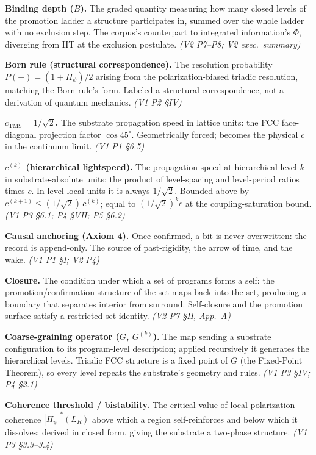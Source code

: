 \documentclass[11pt,oneside]{report}
\theoremstyle{definition}
\theoremstyle{remark}
\begin{document}
\textbf{Binding depth ($B$).} The graded quantity measuring how many closed levels of the promotion ladder a structure participates in, summed over the whole ladder with no exclusion step. The corpus's counterpart to integrated information's $\Phi$, diverging from IIT at the exclusion postulate. \emph{(V2 P7--P8; V2 exec.\ summary)}

\textbf{Born rule (structural correspondence).} The resolution probability $P(+)=(1+\Pi_\psi)/2$ arising from the polarization-biased triadic resolution, matching the Born rule's form. Labeled a structural correspondence, not a derivation of quantum mechanics. \emph{(V1 P2 \S IV)}

\textbf{$c_{\mathrm{TMS}} = 1/\sqrt{2}$.} The substrate propagation speed in lattice units: the FCC face-diagonal projection factor $\cos 45^\circ$. Geometrically forced; becomes the physical $c$ in the continuum limit. \emph{(V1 P1 \S 6.5)}

\textbf{$c^{(k)}$ (hierarchical lightspeed).} The propagation speed at hierarchical level $k$ in substrate-absolute units: the product of level-spacing and level-period ratios times $c$. In level-local units it is always $1/\sqrt{2}$. Bounded above by $c^{(k+1)} \le (1/\sqrt{2})\,c^{(k)}$; equal to $(1/\sqrt{2})^k c$ at the coupling-saturation bound. \emph{(V1 P3 \S 6.1; P4 \S VII; P5 \S 6.2)}

\textbf{Causal anchoring (Axiom 4).} Once confirmed, a bit is never overwritten: the record is append-only. The source of past-rigidity, the arrow of time, and the wake. \emph{(V1 P1 \S I; V2 P4)}

\textbf{Closure.} The condition under which a set of programs forms a self: the promotion/confirmation structure of the set maps back into the set, producing a boundary that separates interior from surround. Self-closure and the promotion surface satisfy a restricted set-identity. \emph{(V2 P7 \S II, App.\ A)}

\textbf{Coarse-graining operator ($G$, $G^{(k)}$).} The map sending a substrate configuration to its program-level description; applied recursively it generates the hierarchical levels. Triadic FCC structure is a fixed point of $G$ (the Fixed-Point Theorem), so every level repeats the substrate's geometry and rules. \emph{(V1 P3 \S IV; P4 \S 2.1)}

\textbf{Coherence threshold / bistability.} The critical value of local polarization coherence $|\Pi_\psi|^*(L_R)$ above which a region self-reinforces and below which it dissolves; derived in closed form, giving the substrate a two-phase structure. \emph{(V1 P3 \S 3.3--3.4)}
\end{document}

